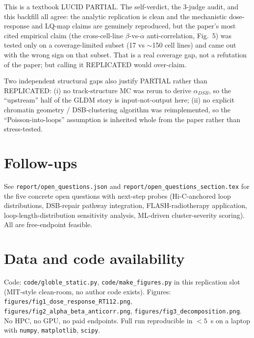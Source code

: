 \documentclass[11pt]{article}
\begin{document}
This is a textbook LUCID PARTIAL. The self-verdict, the 3-judge audit, and
this backfill all agree: the analytic replication is clean and the
mechanistic dose-response and LQ-map claims are genuinely reproduced, but
the paper's most cited empirical claim (the cross-cell-line
$\beta$-vs-$\alpha$ anti-correlation, Fig.~5) was tested only on a
coverage-limited subset (17 vs $\sim$150 cell lines) and came out with the
wrong sign on that subset. That is a real coverage gap, not a refutation
of the paper; but calling it REPLICATED would over-claim.

Two independent structural gaps also justify PARTIAL rather than
REPLICATED: (i) no track-structure MC was rerun to derive
$\alpha_{DSB}$, so the ``upstream'' half of the GLDM story is
input-not-output here; (ii) no explicit chromatin geometry / DSB-clustering
algorithm was reimplemented, so the ``Poisson-into-loops'' assumption is
inherited whole from the paper rather than stress-tested.

\section{Follow-ups}

See \verb|report/open_questions.json| and
\verb|report/open_questions_section.tex| for the five concrete open
questions with next-step probes (Hi-C-anchored loop distributions,
DSB-repair pathway integration, FLASH-radiotherapy application,
loop-length-distribution sensitivity analysis, ML-driven cluster-severity
scoring). All are free-endpoint feasible.

\section*{Data and code availability}

Code: \verb|code/globle_static.py|, \verb|code/make_figures.py| in this
replication slot (MIT-style clean-room, no author code exists).
Figures: \verb|figures/fig1_dose_response_RT112.png|,
\verb|figures/fig2_alpha_beta_anticorr.png|,
\verb|figures/fig3_decomposition.png|.
No HPC, no GPU, no paid endpoints. Full run reproducible in $<5$~s on a
laptop with \verb|numpy|, \verb|matplotlib|, \verb|scipy|.
\end{document}
